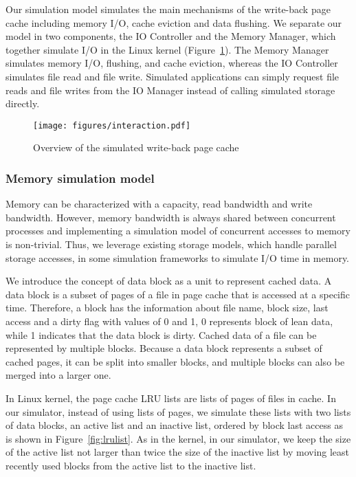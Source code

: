 \documentclass[conference]{IEEEtran}
\begin{document}
			Our simulation model simulates the main mechanisms of the
			write-back page cache including memory I/O, cache eviction and
			data flushing. We separate our model in two components, the IO
			Controller and the Memory Manager, which together simulate I/O
			in the Linux kernel (Figure~\ref{fig:interaction}). The Memory
			Manager simulates memory I/O, flushing, and cache eviction, whereas the
			IO Controller simulates file read and file write.
			Simulated applications can simply request
			file reads and file writes from the IO Manager
			instead of calling simulated storage directly.

			\begin{figure}
   				\centering
   				\texttt{[image: figures/interaction.pdf]}
   				\caption{Overview of the simulated write-back page cache}\label{fig:interaction}
			\end{figure}	

			\subsubsection{Memory simulation model}
			
			Memory can be characterized with a capacity, read bandwidth and write 
			bandwidth. However, memory bandwidth is always shared between 
			concurrent processes and implementing a simulation model of concurrent 
			accesses to memory is non-trivial. Thus, we leverage existing storage 
			models, which handle parallel storage accesses, in some simulation 
			frameworks to simulate I/O time in memory.						

			We introduce the concept of data block as a unit to represent cached data. 
			A data block is a subset of pages of a file in page cache that is accessed 
			at a specific time. Therefore, a block has the information about file name, 
			block size, last access and a dirty flag with values of 0 and 1, 
			0 represents block of lean data, while 1 indicates that the data block 
			is dirty. 
			Cached data of a file can be represented by multiple blocks. 
			Because a data block represents a subset of cached pages, 
			it can be split into smaller blocks, and multiple blocks can also 
			be merged into a larger one.
			
			In Linux kernel, the page cache LRU lists are lists of pages of 
			files in cache. In our simulator, instead of using lists of pages, 
			we simulate these lists with two lists of data blocks, an active list and 
			an inactive list, ordered by block last access as is shown in 
			Figure~\ref{fig:lrulist}.
			As in the kernel, in our simulator, we keep the size of the active list not 
			larger than twice the size of the inactive list by moving least recently 
			used blocks from the active list to the inactive list. 
			
\end{document}
